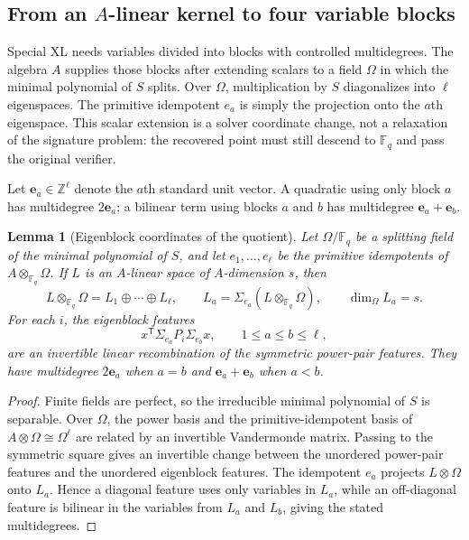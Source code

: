 \documentclass[11pt]{article}
\newtheorem{lemma}[lemma]{Lemma}
\newcommand{\F}{\mathbb F}
\newcommand{\transpose}{\mathsf T}
\begin{document}
\subsection{From an \texorpdfstring{$A$}{A}-linear kernel to four variable blocks}

Special XL needs variables divided into blocks with controlled
multidegrees.  The algebra $A$ supplies those blocks after extending scalars to
a field $\Omega$ in which the minimal polynomial of $S$ splits.  Over
$\Omega$, multiplication by $S$ diagonalizes into $\ell$ eigenspaces.  The
primitive idempotent $e_a$ is simply the projection onto the $a$th eigenspace.
This scalar extension is a solver coordinate change, not a relaxation of the
signature problem: the recovered point must still descend to $\F_q$ and pass
the original verifier.

Let $\mathbf e_a\in\mathbb Z^\ell$ denote the $a$th standard unit vector.  A
quadratic using only block $a$ has multidegree $2\mathbf e_a$; a bilinear term
using blocks $a$ and $b$ has multidegree
$\mathbf e_a+\mathbf e_b$.

\begin{lemma}[Eigenblock coordinates of the quotient]\label{lem:spectral-quotient}
Let $\Omega/\F_q$ be a splitting field of the minimal polynomial of $S$, and
let $e_1,\ldots,e_\ell$ be the primitive idempotents of
$A\otimes_{\F_q}\Omega$.  If $L$ is an $A$-linear space of $A$-dimension
$s$, then
\[
 L\otimes_{\F_q}\Omega=L_1\oplus\cdots\oplus L_\ell,
 \qquad L_a=\Sigma_{e_a}(L\otimes_{\F_q}\Omega),
 \qquad \dim_\Omega L_a=s.
\]
For each $i$, the eigenblock features
\[
 x^\transpose\Sigma_{e_a}P_i\Sigma_{e_b}x,
 \qquad 1\le a\le b\le\ell,
\]
are an invertible linear recombination of the symmetric power-pair features.
They have multidegree $2\mathbf e_a$ when $a=b$ and
$\mathbf e_a+\mathbf e_b$ when $a<b$.
\end{lemma}

\begin{proof}
Finite fields are perfect, so the irreducible minimal polynomial of $S$ is
separable.  Over $\Omega$, the power basis and the primitive-idempotent basis
of $A\otimes\Omega\cong\Omega^\ell$ are related by an invertible Vandermonde
matrix.  Passing to the symmetric square gives an invertible change between the
unordered power-pair features and the unordered eigenblock features.  The
idempotent $e_a$ projects $L\otimes\Omega$ onto $L_a$.  Hence a diagonal
feature uses only variables in $L_a$, while an off-diagonal feature is bilinear
in the variables from $L_a$ and $L_b$, giving the stated multidegrees.
\end{proof}
\end{document}

